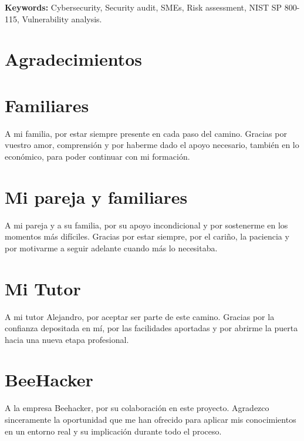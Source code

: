 \documentclass[a4paper, 11pt]{article}
\begin{document}
\textbf{Keywords:} Cybersecurity, Security audit, SMEs, Risk assessment, NIST SP 800-115, Vulnerability analysis.
\clearpage


\thispagestyle{nohead}
\section*{Agradecimientos}
\section*{Familiares}

\begin{minipage}{0.7\textwidth}
A mi familia, por estar siempre presente en cada paso del camino. Gracias por vuestro amor, comprensión y por haberme dado el apoyo necesario, también en lo económico, para poder continuar con mi formación.
\end{minipage}
\clearpage
\thispagestyle{nohead}

\section*{Mi pareja y familiares}

\begin{minipage}{0.7\textwidth}
A mi pareja y a su familia, por su apoyo incondicional y por sostenerme en los momentos más difíciles. Gracias por estar siempre, por el cariño, la paciencia y por motivarme a seguir adelante cuando más lo necesitaba.
\end{minipage}
\clearpage
\thispagestyle{nohead}

\section*{Mi Tutor}

\begin{minipage}{0.7\textwidth}
A mi tutor Alejandro, por aceptar ser parte de este camino. Gracias por la confianza depositada en mí, por las facilidades aportadas y por abrirme la puerta hacia una nueva etapa profesional.
\end{minipage}
\clearpage
\thispagestyle{nohead}

\section*{BeeHacker}
\begin{minipage}{0.7\textwidth}
A la empresa Beehacker, por su colaboración en este proyecto. Agradezco sinceramente la oportunidad que me han ofrecido para aplicar mis conocimientos en un entorno real y su implicación durante todo el proceso.
\end{minipage}
\clearpage
\end{document}
